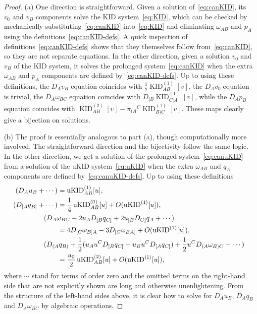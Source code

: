 \documentclass[10pt,a4paper]{amsart}
\newcommand{\KIDi}{\operatorname{KID}^{(1)}}
\newcommand{\KIDii}{\operatorname{KID}^{(2)}}
\newcommand{\uKIDi}{\operatorname{uKID}^{(1)}}
\newcommand{\uKIDii}{\operatorname{uKID}^{(2)}}
\newcommand{\uKIDo}{\operatorname{uKID}^{(0)}}
\begin{document}
\begin{proof}
(a) One direction is straightforward. Given a solution
of~\eqref{eq:canKID}, its $v_0$ and $v_B$ components solve the KID
system~\eqref{eq:KID}, which can be checked by mechanically
substituting~\eqref{eq:canKID} into~\eqref{eq:KID} and eliminating
$\omega_{AB}$ and $p_A$ using the definitions~\eqref{eq:canKID-defs}. A
quick inspection of definitions~\eqref{eq:canKID-defs} shows that they
themselves follow from~\eqref{eq:canKID}, so they are not separate
equations. In the other direction, given a solution $v_0$ and $v_B$ of
the KID system, it solves the prolonged system~\eqref{eq:canKID} when
the extra $\omega_{AB}$ and $p_A$ components are defined
by~\eqref{eq:canKID-defs}. Up to using these definitions, the $D_A v_B$
equation coincides with $\frac{1}{2} \KIDi_{AB}[v]$, the $D_A v_0$
equation is trivial, the $D_A \omega_{BC}$ equation coincides with
$D_{[B} \KIDi_{C]A}[v]$, while the $D_A p_B$ equation coincides with
$\KIDii_{AB}[v] - \pi_{(A}{}^C \KIDi_{B)C}[v]$. These maps clearly give
a bijection on solutions.

(b) The proof is essentially analogous to part (a), though
computationally more involved. The straightforward direction and the
bijectivity follow the same logic. In the other direction, we get a
solution of the prolonged system~\eqref{eq:canuKID} from a solution of
the uKID system~\eqref{eq:uKID} when the extra $\omega_{AB}$ and $q_A$
components are defined by~\eqref{eq:canuKID-defs}. Up to using these
definitions
\begin{align*}
	(D_A u_B + \cdots)
		&= \uKIDi_{AB}[u] , \\
	(D_{[A} q_{B]} + \cdots)
		&= \frac{1}{4} \uKIDo_{AB}[u] + O(\uKIDi[u]) , \\
	\MoveEqLeft
	(D_A \omega_{BC} - 2 u_{A} D_{[B} q_{C]} + 2 u_{[B} D_{C]} q_{A} + \cdots)
		\\
		&= 4 D_{[C} \omega_{B]A}  - 3 D_{[C} \omega_{BA]} + O(\uKIDi[u]) , \\
	\MoveEqLeft
	(D_{(A} q_{B)} + \frac{1}{2} (u_{A} u^C D_{[B} q_{C]} + u_{B} u^C D_{[A} q_{C]}) + \frac{1}{2} u^C D_{(A} \omega_{B)C} + \cdots)
		\\
		&= \frac{u_0}{2} \uKIDii_{AB}[u] + O(\uKIDi[u]) ,
\end{align*}
where $\cdots$ stand for terms of order zero and the omitted terms on
the right-hand side that are not explicitly shown are long and otherwise
unenlightening. From the structure of the left-hand sides above, it is
clear how to solve for $D_A u_B$, $D_A q_B$ and $D_A \omega_{BC}$ by
algebraic operations.
\end{proof}
\end{document}
